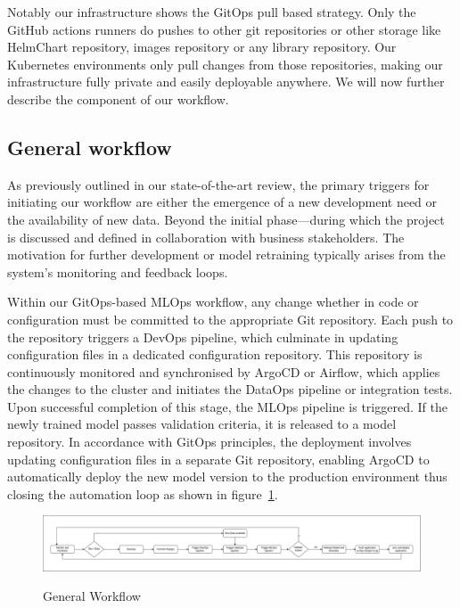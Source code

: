 Notably our infrastructure shows the GitOps pull based strategy.
Only the GitHub actions runners do pushes to other git repositories or other
storage like HelmChart repository, images repository or any library repository.
Our Kubernetes environments only pull changes from those repositories, making our infrastructure fully private and easily deployable anywhere.
We will now further describe the component of our workflow.

\subsection{General workflow}\label{subsec:general-development-workflow}
As previously outlined in our state-of-the-art review, the primary triggers for initiating our workflow are either
the emergence of a new development need or the availability of new data.
Beyond the initial phase—during which the project is discussed and defined in collaboration with business stakeholders.
The motivation for further development or model retraining typically arises from the system's monitoring and feedback loops.

Within our GitOps-based MLOps workflow, any change whether in code or configuration must be committed to the appropriate Git repository.
Each push to the repository triggers a DevOps pipeline, which culminate in updating configuration files in a dedicated configuration repository.
This repository is continuously monitored and synchronised by ArgoCD or Airflow, which applies the changes to the cluster and initiates the DataOps pipeline
or integration tests.
Upon successful completion of this stage, the MLOps pipeline is triggered.
If the newly trained model passes validation criteria, it is released to a model repository.
In accordance with GitOps principles, the deployment involves updating configuration files in a separate Git repository,
enabling ArgoCD to automatically deploy the new model version to the production environment thus closing the automation loop
as shown in figure~\ref{fig:general-workflow}.

\begin{figure}[!htbp]
    \centering
    \caption{General Workflow}
    \includegraphics[width=\linewidth]{images/project/general_workflow}
    \label{fig:general-workflow}
\end{figure}


